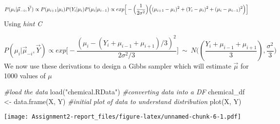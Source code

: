 \documentclass[
]{article}
\newenvironment{Shaded}{\begin{snugshade}}{\end{snugshade}}
\newcommand{\CommentTok}[1]{\textcolor[rgb]{0.56,0.35,0.01}{\textit{#1}}}
\newcommand{\FunctionTok}[1]{\textcolor[rgb]{0.00,0.00,0.00}{#1}}
\newcommand{\NormalTok}[1]{#1}
\newcommand{\OtherTok}[1]{\textcolor[rgb]{0.56,0.35,0.01}{#1}}
\newcommand{\StringTok}[1]{\textcolor[rgb]{0.31,0.60,0.02}{#1}}
\begin{document}
\[
P(\mu_i|\vec\mu_{-i},\vec Y) \propto  P(\mu_{i+1}|\mu_i)P(Y_i|\mu_i)P(\mu_i|\mu_{i-1}) \\
\propto exp\Big[- \Big(\frac{1}{2\sigma^2} \Big) \Big( (\mu_{i+1} - \mu_{i})^2 + (Y_i - \mu_i)^2 + (\mu_{i} - \mu_{i-1})^2 \Big) \Big]
\] Using \emph{hint C}

\[
P(\mu_i|\vec\mu_{-i},\vec Y) \propto exp\Big[ - \frac{(\mu_i-(Y_i+\mu_{i-1}+\mu_{i+1})/3)^2}{2\sigma^2/3} \Big] \ \sim \ N\Big((\frac{Y_i+\mu_{i-1}+\mu_{i+1}}{3}),\frac{\sigma^2}{3}\Big)
\] We now use these derivations to design a Gibbs sampler which will
estimate \(\vec\mu\) for 1000 values of \(\mu\)

\begin{Shaded}
\begin{Highlighting}[]
\CommentTok{\#load the data}
\FunctionTok{load}\NormalTok{(}\StringTok{"chemical.RData"}\NormalTok{)                           }
\CommentTok{\#converting data into a DF}
\NormalTok{chemical\_df }\OtherTok{\textless{}{-}} \FunctionTok{data.frame}\NormalTok{(X, Y)                  }
\CommentTok{\#initial plot of data to understand distribution}
\FunctionTok{plot}\NormalTok{(X, Y) }
\end{Highlighting}
\end{Shaded}

\texttt{[image: Assignment2-report\_files/figure-latex/unnamed-chunk-6-1.pdf]}
\end{document}
